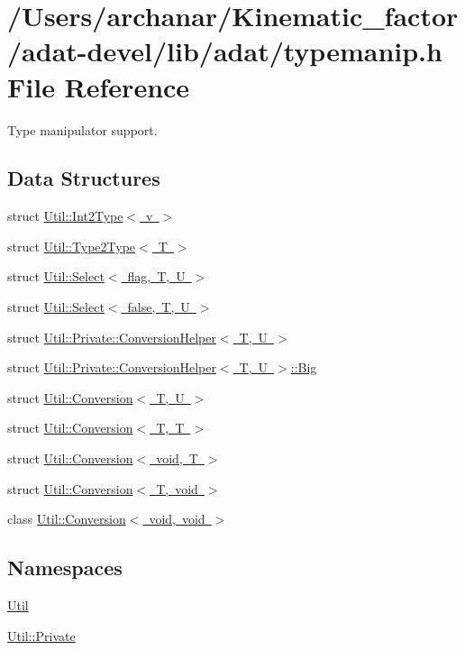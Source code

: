 \hypertarget{adat-devel_2lib_2adat_2typemanip_8h}{}\section{/\+Users/archanar/\+Kinematic\+\_\+factor/adat-\/devel/lib/adat/typemanip.h File Reference}
\label{adat-devel_2lib_2adat_2typemanip_8h}


Type manipulator support.  


\subsection*{Data Structures}
\begin{DoxyCompactItemize}
\item 
struct \mbox{\hyperlink{structUtil_1_1Int2Type}{Util\+::\+Int2\+Type$<$ v $>$}}
\item 
struct \mbox{\hyperlink{structUtil_1_1Type2Type}{Util\+::\+Type2\+Type$<$ T $>$}}
\item 
struct \mbox{\hyperlink{structUtil_1_1Select}{Util\+::\+Select$<$ flag, T, U $>$}}
\item 
struct \mbox{\hyperlink{structUtil_1_1Select_3_01false_00_01T_00_01U_01_4}{Util\+::\+Select$<$ false, T, U $>$}}
\item 
struct \mbox{\hyperlink{structUtil_1_1Private_1_1ConversionHelper}{Util\+::\+Private\+::\+Conversion\+Helper$<$ T, U $>$}}
\item 
struct \mbox{\hyperlink{structUtil_1_1Private_1_1ConversionHelper_1_1Big}{Util\+::\+Private\+::\+Conversion\+Helper$<$ T, U $>$\+::\+Big}}
\item 
struct \mbox{\hyperlink{structUtil_1_1Conversion}{Util\+::\+Conversion$<$ T, U $>$}}
\item 
struct \mbox{\hyperlink{structUtil_1_1Conversion_3_01T_00_01T_01_4}{Util\+::\+Conversion$<$ T, T $>$}}
\item 
struct \mbox{\hyperlink{structUtil_1_1Conversion_3_01void_00_01T_01_4}{Util\+::\+Conversion$<$ void, T $>$}}
\item 
struct \mbox{\hyperlink{structUtil_1_1Conversion_3_01T_00_01void_01_4}{Util\+::\+Conversion$<$ T, void $>$}}
\item 
class \mbox{\hyperlink{classUtil_1_1Conversion_3_01void_00_01void_01_4}{Util\+::\+Conversion$<$ void, void $>$}}
\end{DoxyCompactItemize}
\subsection*{Namespaces}
\begin{DoxyCompactItemize}
\item 
 \mbox{\hyperlink{namespaceUtil}{Util}}
\item 
 \mbox{\hyperlink{namespaceUtil_1_1Private}{Util\+::\+Private}}
\end{DoxyCompactItemize}
